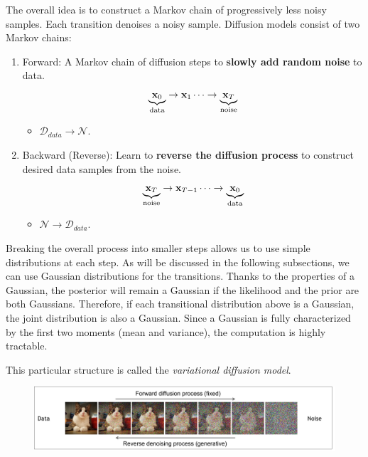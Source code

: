 The overall idea is to construct a Markov chain of progressively less noisy samples. Each transition denoises a noisy sample. Diffusion models consist of two Markov chains:
\begin{enumerate}
	\item Forward: A Markov chain of diffusion steps to \textbf{slowly add random noise} to data. 
		$$\underbrace{{\mathbf{x}}_0}_{\text{data}}\to {\mathbf{x}}_1\cdots\to \underbrace{{\mathbf{x}}_T}_{\text{noise}}$$
		\begin{itemize}
			\item $\mathcal{D}_{data}\to \mathcal{N}$.
		\end{itemize}
	\item Backward (Reverse): Learn to \textbf{reverse the diffusion process} to construct desired data samples from the noise. 
		$$\underbrace{{\mathbf{x}}_T}_{\text{noise}}\to {\mathbf{x}}_{T-1}\cdots\to \underbrace{{\mathbf{x}}_0}_{\text{data}}$$

		\begin{itemize}
			\item $\mathcal{N}\to \mathcal{D}_{data}$.
		\end{itemize}
\end{enumerate}
Breaking the overall process into smaller steps allows us to use simple distributions at each step. As will be discussed in the following subsections, we can use Gaussian distributions for the transitions. Thanks to the properties of a Gaussian, the posterior will remain a Gaussian if the likelihood and the prior are both Gaussians. Therefore, if each transitional distribution above is a Gaussian, the joint distribution is also a Gaussian. Since a Gaussian is fully characterized by the first two moments (mean and variance), the computation is highly tractable. 

This particular structure is called the \textit{variational diffusion model}.
\begin{figure}[t]
	\centering
	\includegraphics[scale=0.28]{./images/diffusion/diffusion_model.png}
\end{figure}

